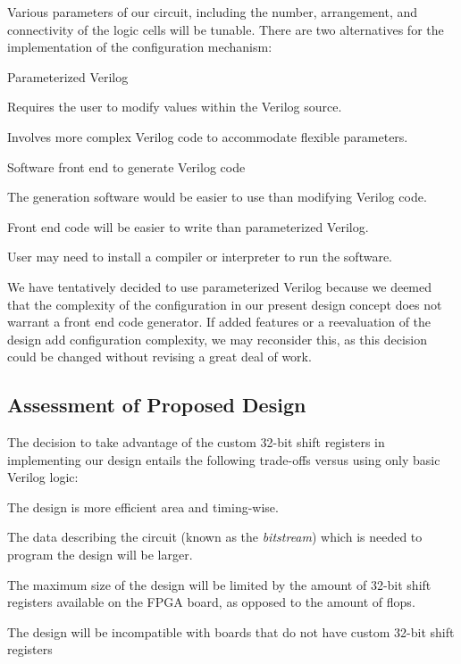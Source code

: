 Various parameters of our circuit, including the number, arrangement, and connectivity of the logic cells will be tunable.
There are two alternatives for the implementation of the configuration mechanism:
\begin{enumeration}
	\item Parameterized Verilog \
		\begin{itemlist}
			\item Requires the user to modify values within the Verilog source.
			\item Involves more complex Verilog code to accommodate flexible parameters.
		\end{itemlist}
	\item Software front end to generate Verilog code \
		\begin{itemlist}
			\item The generation software would be easier to use than modifying Verilog code.
			\item Front end code will be easier to write than parameterized Verilog.
			\item User may need to install a compiler or interpreter to run the software.
		\end{itemlist}
\end{enumeration}

We have tentatively decided to use parameterized Verilog because we deemed that the complexity of the configuration in our present design concept does not warrant a front end code generator.
If added features or a reevaluation of the design add configuration complexity, we may reconsider this, as this decision could be changed without revising a great deal of work.



\subsection{Assessment of Proposed Design} %


The decision to take advantage of the custom 32-bit shift registers in implementing our design entails the following trade-offs versus using only basic Verilog logic:
\begin{itemlist}
	\item The design is more efficient area and timing-wise.
	\item The data describing the circuit (known as the \emph{bitstream}) which is needed to program the design will be larger.
	\item The maximum size of the design will be limited by the amount of 32-bit shift registers available on the FPGA board, as opposed to the amount of flops.
	\item The design will be incompatible with boards that do not have custom 32-bit shift registers
\end{itemlist}

